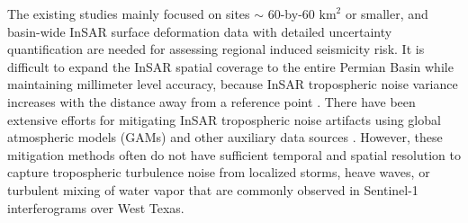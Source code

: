 The existing studies mainly focused on sites $ \sim $ 60-by-60 $\text{km}^2$ or smaller, and basin-wide InSAR surface deformation data with detailed uncertainty quantification are needed for assessing regional induced seismicity risk. It is difficult to expand the InSAR spatial coverage to the entire Permian Basin while maintaining millimeter level accuracy, because InSAR tropospheric noise variance increases with the distance away from a reference point \citep{Emardson2003NeutralAtmosphericDelay}. There have been extensive efforts for mitigating InSAR tropospheric noise artifacts using global atmospheric models (GAMs) and other auxiliary data sources \citep{Lauknes2011InsarTroposphericStratification, Bekaert2015SpatiallyVariablePower, Doin2009CorrectionsStratifiedTropospheric, Li2005InterferometricSyntheticAperture,Ding2008AtmosphericEffectsInsar}. However, these mitigation methods often do not have sufficient temporal and spatial resolution to capture tropospheric turbulence noise from localized storms, heave waves, or turbulent mixing of water vapor that are commonly observed in Sentinel-1 interferograms over West Texas. 

